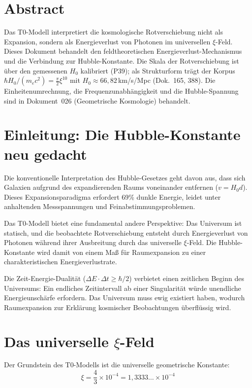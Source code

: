 \section*{Abstract}
	Das T0-Modell interpretiert die kosmologische Rotverschiebung nicht als Expansion, sondern als Energieverlust von Photonen im universellen $\xi$-Feld. Dieses Dokument behandelt den feldtheoretischen Energieverlust-Mechanismus und die Verbindung zur Hubble-Konstante. Die Skala der Rotverschiebung ist über den gemessenen $H_0$ kalibriert (P39); als Strukturform trägt der Korpus $\hbar H_0/(m_ec^2) = \frac{\pi}{2}\xi^{10}$ mit $H_0 \approx 66{,}82\,$km/s/Mpc (Dok.~165, 388). Die Einheitenumrechnung, die Frequenzunabhängigkeit und die Hubble-Spannung sind in Dokument~026 (Geometrische Kosmologie) behandelt.


\section{Einleitung: Die Hubble-Konstante neu gedacht}

	Die konventionelle Interpretation des Hubble-Gesetzes geht davon aus, dass sich Galaxien aufgrund des expandierenden Raums voneinander entfernen ($v = H_0 d$). Dieses Expansionsparadigma erfordert 69\% dunkle Energie, leidet unter anhaltenden Messspannungen und Feinabstimmungsproblemen.

	Das T0-Modell bietet eine fundamental andere Perspektive: Das Universum ist statisch, und die beobachtete Rotverschiebung entsteht durch Energieverlust von Photonen während ihrer Ausbreitung durch das universelle $\xi$-Feld. Die Hubble-Konstante wird damit von einem Maß für Raumexpansion zu einer charakteristischen Energieverlustrate.

	Die Zeit-Energie-Dualität ($\Delta E \cdot \Delta t \geq \hbar/2$) verbietet einen zeitlichen Beginn des Universums: Ein endliches Zeitintervall ab einer Singularität würde unendliche Energieunschärfe erfordern. Das Universum muss ewig existiert haben, wodurch Raumexpansion zur Erklärung kosmischer Beobachtungen überflüssig wird.

\section{Das universelle $\xi$-Feld}

	Der Grundstein des T0-Modells ist die universelle geometrische Konstante:
	\begin{equation}
		\xi = \frac{4}{3} \times 10^{-4} = 1{,}3333\ldots \times 10^{-4}
	\end{equation}

